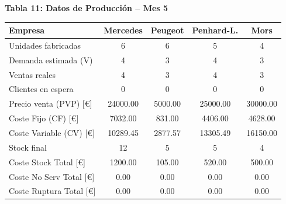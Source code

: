 \documentclass{standalone}
\begin{document}
%		
%	
%	
	\begin{minipage}{1.08\linewidth}
		\centering
		
		\textbf{Tabla 11: Datos de Producción – Mes 5}\\[0.5em]
		\begin{tabular}{@{}l
				S[table-format=2.0]
				S[table-format=2.0]
				S[table-format=2.0]
				S[table-format=2.0]@{}}
			\toprule
			\textbf{Empresa} & \textbf{Mercedes} & \textbf{Peugeot} & \textbf{Penhard-L.} & \textbf{Mors} \\
			\midrule
			Unidades fabricadas & 6 & 6 & 5 & 4 \\
			Demanda estimada (V) & 4 & 3 & 4 & 3 \\
			Ventas reales & 4 & 3 & 4 & 3 \\
			Clientes en espera & 0 & 0 & 0 & 0 \\
			Precio venta (PVP) [\euro] & 24000.00 & 5000.00 & 25000.00 & 30000.00 \\
			Coste Fijo (CF) [\euro] & 7032.00 & 831.00 & 4406.00 & 4628.00 \\
			Coste Variable (CV) [\euro] & 10289.45 & 2877.57 & 13305.49 & 16150.00 \\
			Stock final & 12 & 5 & 5 & 4 \\
			Coste Stock Total [\euro] & 1200.00 & 105.00 & 520.00 & 500.00 \\
			Coste No Serv Total [\euro] & 0.00 & 0.00 & 0.00 & 0.00 \\
			Coste Ruptura Total [\euro] & 0.00 & 0.00 & 0.00 & 0.00 \\
			\bottomrule
		\end{tabular}
		
		\vspace{2em} %
		

\end{minipage}
\end{document}
